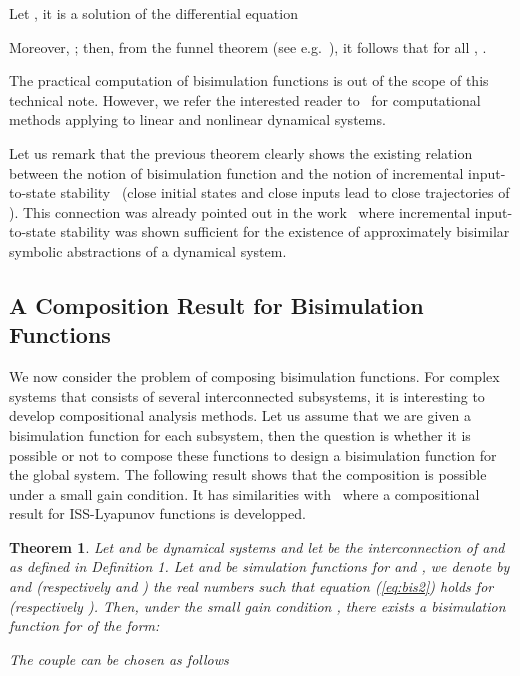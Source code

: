 \documentclass[a4paper,12pt,twoside]{article}
\newtheorem{theorem}{Theorem}
\begin{document}
Let , it is a solution of the differential equation

Moreover, ; then, from the funnel theorem (see e.g.~\cite{Hubbard95}), it follows that for all ,
.
 

The practical computation of bisimulation functions is out of the scope of this technical note. However, we refer the interested reader to~\cite{Girard05,Girard07b} for computational methods applying to linear and nonlinear dynamical systems. 

Let us remark that the previous theorem clearly shows the existing relation
between the notion of bisimulation function and the notion of incremental input-to-state stability~\cite{angeli2002}
(close initial states and close inputs lead to close trajectories of ).
This connection was already pointed out in the work~\cite{Pola07} where incremental input-to-state stability
was shown sufficient for the existence of approximately bisimilar symbolic abstractions of a dynamical system.



\subsection{A Composition Result for Bisimulation Functions}

We now consider the problem of composing bisimulation functions. For complex systems that consists of several interconnected subsystems, it is interesting to develop compositional analysis methods. Let us assume that we are given a bisimulation function for each subsystem, then the question is whether it is possible or not to compose these functions
to design a bisimulation function for the global system. The following result shows that the composition is possible under a small gain condition. It has similarities with~\cite{Jiang96} where a compositional result for ISS-Lyapunov functions
is developped.

\begin{theorem} Let  and  be dynamical systems and let  be the interconnection of  and  as defined in Definition 1. Let  and  be simulation functions for  and ,
we denote by  and  (respectively  and ) the real numbers such that equation (\ref{eq:bis2}) holds for  (respectively ). 
Then, under the small gain condition , there exists  a bisimulation
function for  of the form:

The couple  can be chosen as follows


\end{theorem}
\end{document}
